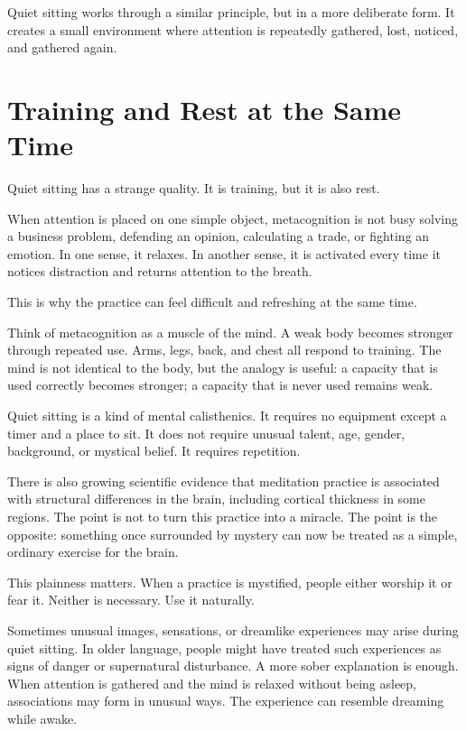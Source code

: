 Quiet sitting works through a similar principle, but in a more deliberate form. It creates a small environment where attention is repeatedly gathered, lost, noticed, and gathered again.

\section*{Training and Rest at the Same Time}

Quiet sitting has a strange quality. It is training, but it is also rest.

When attention is placed on one simple object, metacognition is not busy solving a business problem, defending an opinion, calculating a trade, or fighting an emotion. In one sense, it relaxes. In another sense, it is activated every time it notices distraction and returns attention to the breath.

This is why the practice can feel difficult and refreshing at the same time.

Think of metacognition as a muscle of the mind. A weak body becomes stronger through repeated use. Arms, legs, back, and chest all respond to training. The mind is not identical to the body, but the analogy is useful: a capacity that is used correctly becomes stronger; a capacity that is never used remains weak.

Quiet sitting is a kind of mental calisthenics. It requires no equipment except a timer and a place to sit. It does not require unusual talent, age, gender, background, or mystical belief. It requires repetition.

There is also growing scientific evidence that meditation practice is associated with structural differences in the brain, including cortical thickness in some regions. The point is not to turn this practice into a miracle. The point is the opposite: something once surrounded by mystery can now be treated as a simple, ordinary exercise for the brain.

This plainness matters. When a practice is mystified, people either worship it or fear it. Neither is necessary. Use it naturally.

Sometimes unusual images, sensations, or dreamlike experiences may arise during quiet sitting. In older language, people might have treated such experiences as signs of danger or supernatural disturbance. A more sober explanation is enough. When attention is gathered and the mind is relaxed without being asleep, associations may form in unusual ways. The experience can resemble dreaming while awake.

